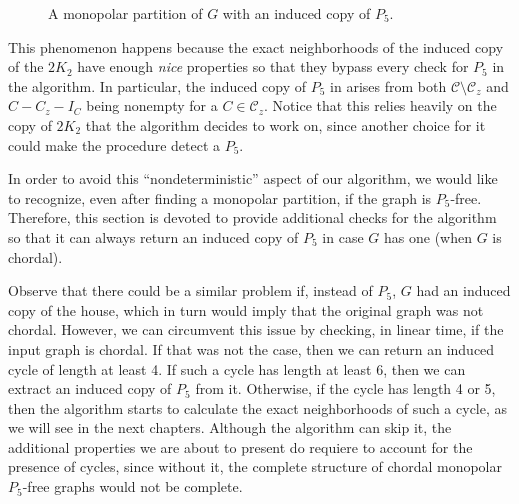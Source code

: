 \begin{figure}[htb!]
    \caption{A monopolar partition of $G$ with an induced copy of $P_5$.}
    \label{fig:variant_chordal_1}
\end{figure}

This phenomenon happens because the exact neighborhoods of the induced copy of
the $2K_2$ have enough \textit{nice} properties so that they bypass every check
for $P_5$ in the algorithm. In particular, the induced copy of $P_5$ in
 arises from both $\mathcal{C}\setminus
\mathcal{C}_z$ and $C-C_z-I_C$ being nonempty for a $C\in\mathcal{C}_z$. Notice
that this relies heavily on the copy of $2K_2$ that the algorithm decides to
work on, since another choice for it could make the procedure detect a $P_5$.

In order to avoid this ``nondeterministic'' aspect of our algorithm, we would
like to recognize, even after finding a monopolar partition, if the graph is
$P_5$-free. Therefore, this section is devoted to provide additional checks for
the algorithm so that it can always return an induced copy of $P_5$ in case $G$
has one (when $G$ is chordal).

Observe that there could be a similar problem if, instead of $P_5$, $G$ had an
induced copy of the house, which in turn would imply that the original graph was
not chordal. However, we can circumvent this issue by checking, in linear time,
if the input graph is chordal. If that was not the case, then we can return an
induced cycle of length at least 4. If such a cycle has length at least 6, then
we can extract an induced copy of $P_5$ from it. Otherwise, if the cycle has
length 4 or 5, then the algorithm starts to calculate the exact neighborhoods of
such a cycle, as we will see in the next chapters. Although the algorithm can
skip it, the additional properties we are about to present do requiere to
account for the presence of cycles, since without it, the complete structure of
chordal monopolar $P_5$-free graphs would not be complete.

